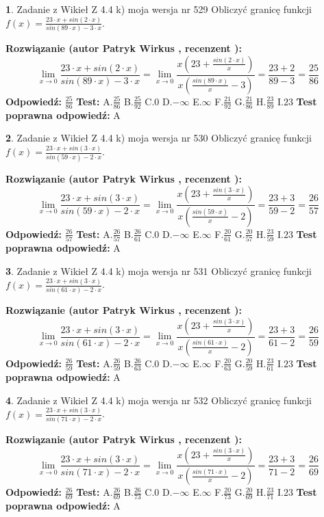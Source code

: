 \documentclass[12pt, a4paper]{article}
\theoremstyle{definition} %
\newtheorem{zad}{}
\newcommand{\zadStart}[1]{\begin{zad}#1\newline}
\newcommand{\zadStop}{\end{zad}}
\newcommand{\rozwStart}[2]{\noindent \textbf{Rozwiązanie (autor #1 , recenzent #2): }\newline}
\newcommand{\rozwStop}{\newline}
\newcommand{\odpStart}{\noindent \textbf{Odpowiedź:}\newline}
\newcommand{\odpStop}{\newline}
\newcommand{\testStart}{\noindent \textbf{Test:}\newline}
\newcommand{\testStop}{\newline}
\newcommand{\kluczStart}{\noindent \textbf{Test poprawna odpowiedź:}\newline}
\newcommand{\kluczStop}{\newline}
\begin{document}
\zadStart{Zadanie z Wikieł Z 4.4 k) moja wersja nr 529}
Obliczyć granicę funkcji $f(x)=\frac{23\cdot x +sin(2\cdot x)}{sin(89\cdot x) -3\cdot x}$.
\zadStop
\rozwStart{Patryk Wirkus}{}
$$\lim\limits_{x\to 0}\frac{23\cdot x +sin(2\cdot x)}{sin(89\cdot x) -3\cdot x}
=\lim\limits_{x\to 0}\frac{x(23+\frac{sin(2\cdot x)}{x})}{x(\frac{sin(89\cdot x)}{x}-3)}
=\frac{23+2}{89-3} = \frac{25}{86}$$
\rozwStop
\odpStart
$\frac{25}{86}$
\odpStop
\testStart
A.$\frac{25}{86}$
B.$\frac{25}{92}$
C.$0$
D.$-\infty$
E.$\infty$
F.$\frac{21}{92}$
G.$\frac{21}{86}$
H.$\frac{23}{89}$
I.$23$
\testStop
\kluczStart
A
\kluczStop



\zadStart{Zadanie z Wikieł Z 4.4 k) moja wersja nr 530}
Obliczyć granicę funkcji $f(x)=\frac{23\cdot x +sin(3\cdot x)}{sin(59\cdot x) -2\cdot x}$.
\zadStop
\rozwStart{Patryk Wirkus}{}
$$\lim\limits_{x\to 0}\frac{23\cdot x +sin(3\cdot x)}{sin(59\cdot x) -2\cdot x}
=\lim\limits_{x\to 0}\frac{x(23+\frac{sin(3\cdot x)}{x})}{x(\frac{sin(59\cdot x)}{x}-2)}
=\frac{23+3}{59-2} = \frac{26}{57}$$
\rozwStop
\odpStart
$\frac{26}{57}$
\odpStop
\testStart
A.$\frac{26}{57}$
B.$\frac{26}{61}$
C.$0$
D.$-\infty$
E.$\infty$
F.$\frac{20}{61}$
G.$\frac{20}{57}$
H.$\frac{23}{59}$
I.$23$
\testStop
\kluczStart
A
\kluczStop



\zadStart{Zadanie z Wikieł Z 4.4 k) moja wersja nr 531}
Obliczyć granicę funkcji $f(x)=\frac{23\cdot x +sin(3\cdot x)}{sin(61\cdot x) -2\cdot x}$.
\zadStop
\rozwStart{Patryk Wirkus}{}
$$\lim\limits_{x\to 0}\frac{23\cdot x +sin(3\cdot x)}{sin(61\cdot x) -2\cdot x}
=\lim\limits_{x\to 0}\frac{x(23+\frac{sin(3\cdot x)}{x})}{x(\frac{sin(61\cdot x)}{x}-2)}
=\frac{23+3}{61-2} = \frac{26}{59}$$
\rozwStop
\odpStart
$\frac{26}{59}$
\odpStop
\testStart
A.$\frac{26}{59}$
B.$\frac{26}{63}$
C.$0$
D.$-\infty$
E.$\infty$
F.$\frac{20}{63}$
G.$\frac{20}{59}$
H.$\frac{23}{61}$
I.$23$
\testStop
\kluczStart
A
\kluczStop



\zadStart{Zadanie z Wikieł Z 4.4 k) moja wersja nr 532}
Obliczyć granicę funkcji $f(x)=\frac{23\cdot x +sin(3\cdot x)}{sin(71\cdot x) -2\cdot x}$.
\zadStop
\rozwStart{Patryk Wirkus}{}
$$\lim\limits_{x\to 0}\frac{23\cdot x +sin(3\cdot x)}{sin(71\cdot x) -2\cdot x}
=\lim\limits_{x\to 0}\frac{x(23+\frac{sin(3\cdot x)}{x})}{x(\frac{sin(71\cdot x)}{x}-2)}
=\frac{23+3}{71-2} = \frac{26}{69}$$
\rozwStop
\odpStart
$\frac{26}{69}$
\odpStop
\testStart
A.$\frac{26}{69}$
B.$\frac{26}{73}$
C.$0$
D.$-\infty$
E.$\infty$
F.$\frac{20}{73}$
G.$\frac{20}{69}$
H.$\frac{23}{71}$
I.$23$
\testStop
\kluczStart
A
\kluczStop
\end{document}

